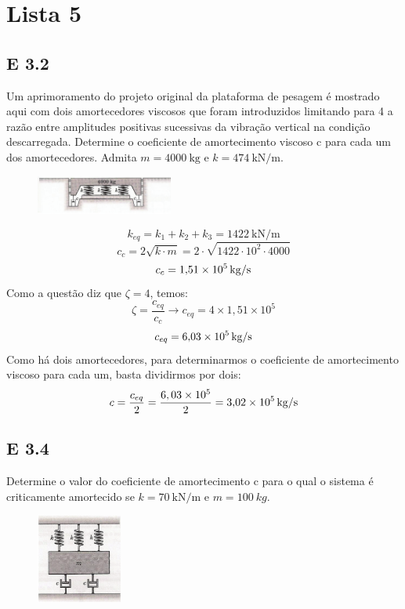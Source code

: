 \section{Lista 5}
\subsection{E 3.2}
Um aprimoramento do projeto original da plataforma de pesagem é
mostrado aqui com dois amortecedores viscosos que foram introduzidos
limitando para 4 a razão entre amplitudes positivas sucessivas da vibração
vertical na condição descarregada. Determine o coeficiente de
amortecimento viscoso c para cada um dos amortecedores. Admita $m=\SI{4000}{\kilogram}$
e $k=\SI{474}{\kilo\newton\per\meter}$.
\begin{figure}[ht]
    \centering
    \includegraphics[width=0.4\textwidth]{imagens/questao_3.2.png}
    \label{fig:questao3_2}
\end{figure}
\resol
\[k_{eq}=k_1+k_2+k_3 = \SI{1422}{\kilo\newton\per\meter}\]
\[
c_{c}=2\sqrt{k\cdot m} = 2\cdot\sqrt{1422\cdot 10^{2}\cdot 4000}
\]
\[ c_{c} = \SI{1,51d5}{\kilogram\per\second} \]
Como a questão diz que $\zeta = 4$, temos:
\[\zeta=\frac{c_{eq}}{c_{c}} \to c_{eq} = 4 \times 1,51\times 10^{5}
\]
\[
c_{eq}= \SI{6,03d 5}{\kilogram\per\second}
\]
Como há dois amortecedores, para determinarmos o coeficiente de amortecimento viscoso
para cada um, basta dividirmos por dois:
\[
    c = \frac{c_{eq}}{2} = \frac{6,03\times 10^{5}}{2} = \SI{3,02d 5}{kg /s}
\]
\subsection{E 3.4}
 Determine o valor do coeficiente de amortecimento c para o qual o
sistema é criticamente amortecido se $k = \SI{70}{\kilo\newton\per\meter}$ e $m=\SI{100}{kg}$.

\begin{figure}[ht]
    \centering
    \includegraphics[width=0.25\textwidth]{imagens/questao_3.4.png}
    \label{fig:}
\end{figure}


